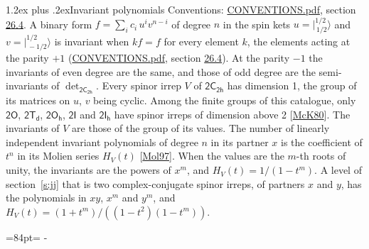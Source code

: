 \documentclass[10pt,a4paper]{article}
\makeatletter
\renewcommand\section{\@startsection{section}{1}{\z@}{-3ex plus -1ex minus -.2ex}%
  {1.2ex plus .2ex}{\normalfont\large\sffamily\bfseries\color{parttitle}}}
\newcommand{\needspace}[1]{\par\penalty-100\begingroup\dimen0=#1\relax\dimen2=\pagegoal
  \advance\dimen2-\pagetotal\ifdim\dimen0>\dimen2\relax\ifdim\dimen2>0pt\vfil\break\fi\fi
  \endgroup}
\numberwithin{equation}{section}
\newcommand{\grp}[1]{\mathsf{#1}}
\newcommand{\jm}[2]{\bigl\lvert{}^{#1}_{\,#2}\bigr\rangle}
\makeatother
\begin{document}
\section{Invariant polynomials}\label{s:invariants}
Conventions: \href{../../CONVENTIONS.pdf}{CONVENTIONS.pdf}, section \href{../../CONVENTIONS.pdf\#conv.26.4}{26.4}.
\leavevmode\label{n:local.binary.form}A binary form $f = \sum_i c_i\, u^i v^{n-i}$ of degree $n$ in the spin kets $u = \jm{1/2}{1/2}$ and $v = \jm{1/2}{-1/2}$ is invariant when $k f = f$ for every element $k$, the elements acting at the parity $+1$ (\href{../../CONVENTIONS.pdf}{CONVENTIONS.pdf}, section \href{../../CONVENTIONS.pdf\#conv.26.4}{26.4}). At the parity $-1$ the invariants of even degree are the same, and those of odd degree are the semi-invariants of $\det_{\grp{2C_{2h}}}$.
\leavevmode\label{n:function.hilbert}Every spinor irrep $V$ of $\grp{2C_{2h}}$ has dimension 1, the group of its matrices on $u$, $v$ being cyclic. Among the finite groups of this catalogue, only $\grp{2O}$, $\grp{2T_{d}}$, $\grp{2O_{h}}$, $\grp{2I}$ and $\grp{2I_{h}}$ have spinor irreps of dimension above 2 [\href{../../../REFERENCES.pdf\#ref.McK80}{McK80}]. The invariants of $V$ are those of the group of its values. \label{n:local.partner.x}The number of linearly independent invariant polynomials of degree $n$ in its partner $x$ is the coefficient of $t^n$ in its Molien series $H_V(t)$ [\href{../../../REFERENCES.pdf\#ref.Mol97}{Mol97}]. When the values are the $m$-th roots of unity, the invariants are the powers of $x^{m}$, and $H_V(t) = 1/(1 - t^{m})$. A level of section~\ref{s:jj} that is two complex-conjugate spinor irreps, of partners $x$ and $y$, has the polynomials in $xy$, $x^{m}$ and $y^{m}$, and $H_V(t) = (1 + t^{m})/((1 - t^{2})(1 - t^{m}))$.
\needspace{84pt}
\end{document}
